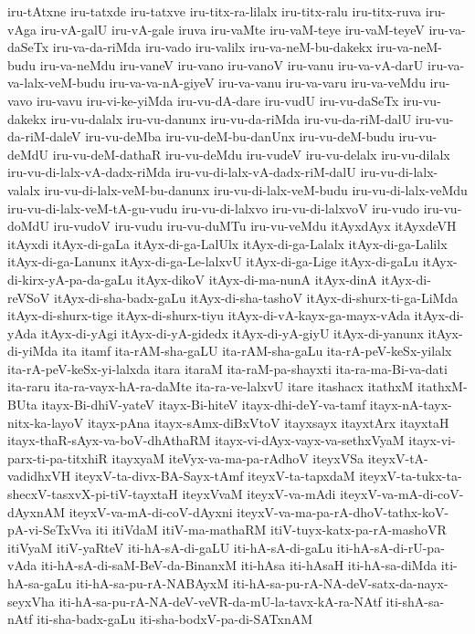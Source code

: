 {iru-tAtxne
iru-tatxde
iru-tatxve
iru-titx-ra-lilalx
iru-titx-ralu
iru-titx-ruva
iru-vAga
iru-vA-galU
iru-vA-gale
iruva
iru-vaMte
iru-vaM-teye
iru-vaM-teyeV
iru-va-daSeTx
iru-va-da-riMda
iru-vado
iru-valilx
iru-va-neM-bu-dakekx
iru-va-neM-budu
iru-va-neMdu
iru-vaneV
iru-vano
iru-vanoV
iru-vanu
iru-va-vA-darU
iru-va-va-lalx-veM-budu
iru-va-va-nA-giyeV
iru-va-vanu
iru-va-varu
iru-va-veMdu
iru-vavo
iru-vavu
iru-vi-ke-yiMda
iru-vu-dA-dare
iru-vudU
iru-vu-daSeTx
iru-vu-dakekx
iru-vu-dalalx
iru-vu-danunx
iru-vu-da-riMda
iru-vu-da-riM-dalU
iru-vu-da-riM-daleV
iru-vu-deMba
iru-vu-deM-bu-danUnx
iru-vu-deM-budu
iru-vu-deMdU
iru-vu-deM-dathaR
iru-vu-deMdu
iru-vudeV
iru-vu-delalx
iru-vu-dilalx
iru-vu-di-lalx-vA-dadx-riMda
iru-vu-di-lalx-vA-dadx-riM-dalU
iru-vu-di-lalx-valalx
iru-vu-di-lalx-veM-bu-danunx
iru-vu-di-lalx-veM-budu
iru-vu-di-lalx-veMdu
iru-vu-di-lalx-veM-tA-gu-vudu
iru-vu-di-lalxvo
iru-vu-di-lalxvoV
iru-vudo
iru-vu-doMdU
iru-vudoV
iru-vudu
iru-vu-duMTu
iru-vu-veMdu
itAyxdAyx
itAyxdeVH
itAyxdi
itAyx-di-gaLa
itAyx-di-ga-LalUlx
itAyx-di-ga-Lalalx
itAyx-di-ga-Lalilx
itAyx-di-ga-Lanunx
itAyx-di-ga-Le-lalxvU
itAyx-di-ga-Lige
itAyx-di-gaLu
itAyx-di-kirx-yA-pa-da-gaLu
itAyx-dikoV
itAyx-di-ma-nunA
itAyx-dinA
itAyx-di-reVSoV
itAyx-di-sha-badx-gaLu
itAyx-di-sha-tashoV
itAyx-di-shurx-ti-ga-LiMda
itAyx-di-shurx-tige
itAyx-di-shurx-tiyu
itAyx-di-vA-kayx-ga-mayx-vAda
itAyx-di-yAda
itAyx-di-yAgi
itAyx-di-yA-gidedx
itAyx-di-yA-giyU
itAyx-di-yanunx
itAyx-di-yiMda
ita
itamf
ita-rAM-sha-gaLU
ita-rAM-sha-gaLu
ita-rA-peV-keSx-yilalx
ita-rA-peV-keSx-yi-lalxda
itara
itaraM
ita-raM-pa-shayxti
ita-ra-ma-Bi-va-dati
ita-raru
ita-ra-vayx-hA-ra-daMte
ita-ra-ve-lalxvU
itare
itashacx
itathxM
itathxM-BUta
itayx-Bi-dhiV-yateV
itayx-Bi-hiteV
itayx-dhi-deY-va-tamf
itayx-nA-tayx-nitx-ka-layoV
itayx-pAna
itayx-sAmx-diBxVtoV
itayxsayx
itayxtArx
itayxtaH
itayx-thaR-sAyx-va-boV-dhAthaRM
itayx-vi-dAyx-vayx-va-sethxVyaM
itayx-vi-parx-ti-pa-titxhiR
itayxyaM
iteVyx-va-ma-pa-rAdhoV
iteyxVSa
iteyxV-tA-vadidhxVH
iteyxV-ta-divx-BA-Sayx-tAmf
iteyxV-ta-tapxdaM
iteyxV-ta-tukx-ta-shecxV-tasxvX-pi-tiV-tayxtaH
iteyxVvaM
iteyxV-va-mAdi
iteyxV-va-mA-di-coV-dAyxnAM
iteyxV-va-mA-di-coV-dAyxni
iteyxV-va-ma-pa-rA-dhoV-tathx-koV-pA-vi-SeTxVva
iti
itiVdaM
itiV-ma-mathaRM
itiV-tuyx-katx-pa-rA-mashoVR
itiVyaM
itiV-yaRteV
iti-hA-sA-di-gaLU
iti-hA-sA-di-gaLu
iti-hA-sA-di-rU-pa-vAda
iti-hA-sA-di-saM-BeV-da-BinanxM
iti-hAsa
iti-hAsaH
iti-hA-sa-diMda
iti-hA-sa-gaLu
iti-hA-sa-pu-rA-NABAyxM
iti-hA-sa-pu-rA-NA-deV-satx-da-nayx-seyxVha
iti-hA-sa-pu-rA-NA-deV-veVR-da-mU-la-tavx-kA-ra-NAtf
iti-shA-sa-nAtf
iti-sha-badx-gaLu
iti-sha-bodxV-pa-di-SATxnAM
}
